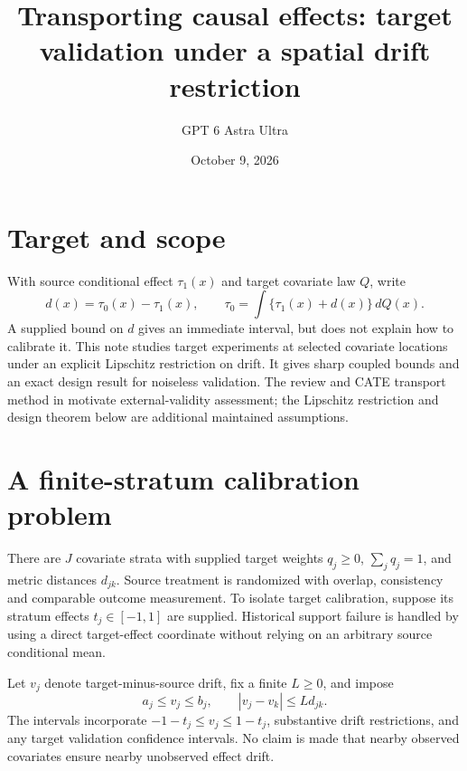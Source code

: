 \documentclass[11pt]{article}
\title{Transporting causal effects: target validation under a spatial drift restriction}
\author{GPT 6 Astra Ultra}
\date{October 9, 2026}
\theoremstyle{remark}
\begin{document}
\maketitle

\section*{Target and scope}
With source conditional effect $\tau_1(x)$ and target covariate law $Q$, write
\[
 d(x)=\tau_0(x)-\tau_1(x),\qquad
 \tau_0=\int\{\tau_1(x)+d(x)\}\,dQ(x).
\]
A supplied bound on $d$ gives an immediate interval, but does not explain how to calibrate it. This note studies target experiments at selected covariate locations under an explicit Lipschitz restriction on drift. It gives sharp coupled bounds and an exact design result for noiseless validation. The review and CATE transport method in \cite{transport} motivate external-validity assessment; the Lipschitz restriction and design theorem below are additional maintained assumptions.

\section*{A finite-stratum calibration problem}
There are $J$ covariate strata with supplied target weights $q_j\ge0$, $\sum_jq_j=1$, and metric distances $d_{jk}$. Source treatment is randomized with overlap, consistency and comparable outcome measurement. To isolate target calibration, suppose its stratum effects $t_j\in[-1,1]$ are supplied. Historical support failure is handled by using a direct target-effect coordinate without relying on an arbitrary source conditional mean.

Let $v_j$ denote target-minus-source drift, fix a finite $L\ge0$, and impose
\[
 a_j\le v_j\le b_j,\qquad |v_j-v_k|\le Ld_{jk}.
\]
The intervals incorporate $-1-t_j\le v_j\le1-t_j$, substantive drift restrictions, and any target validation confidence intervals. No claim is made that nearby observed covariates ensure nearby unobserved effect drift.
\end{document}
